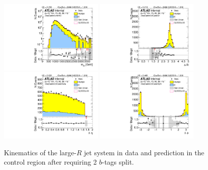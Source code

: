 \begin{figure}[htbp!]
\begin{center}
\includegraphics[angle=270, width=0.45\textwidth]{./figures/boosted/Control/b77_TwoTag_split_Control_mHH_l_1.pdf}
\includegraphics[angle=270, width=0.45\textwidth]{./figures/boosted/Control/b77_TwoTag_split_Control_hCandDr.pdf}\\
\includegraphics[angle=270, width=0.45\textwidth]{./figures/boosted/Control/b77_TwoTag_split_Control_hCandDeta.pdf}
\includegraphics[angle=270, width=0.45\textwidth]{./figures/boosted/Control/b77_TwoTag_split_Control_hCandDphi.pdf}
  \caption{Kinematics of the large-$R$ jet system in data and prediction in the control region after requiring 2 $b$-tags split.  }
  \label{fig:boosted-2bs-control-ak10-system}
\end{center}
\end{figure}

